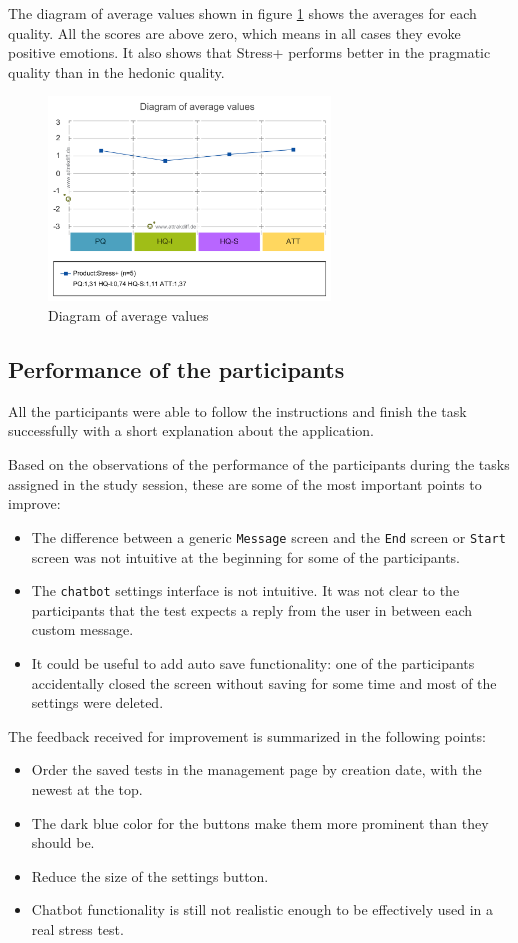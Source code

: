 \documentclass[conference]{IEEEtran}
\begin{document}
The diagram of average values shown in figure \ref{figure-avg-vals} shows the
averages for each quality. All the scores are above zero, which means in all
cases they evoke positive emotions. It also shows that Stress+ performs better
in the pragmatic quality than in the hedonic quality.

\begin{figure}[t!]
\centering
\includegraphics[width=7.5cm]{AttrakDiff/Diagram of average values.png}
\caption{\label{figure-avg-vals}Diagram of average values}
\end{figure}

\subsection{Performance of the participants}
\label{sec:orgbe6298c}
All the participants were able to follow the instructions and finish the task
successfully with a short explanation about the application.

Based on the observations of the performance of the participants during the
tasks assigned in the study session, these are some of the most important points
to improve:
\begin{itemize}
\item The difference between a generic \texttt{Message} screen and the \texttt{End} screen or
\texttt{Start} screen was not intuitive at the beginning for some of the
participants.
\item The \texttt{chatbot} settings interface is not intuitive. It was not clear to the
participants that the test expects a reply from the user in between each
custom message.
\item It could be useful to add auto save functionality: one of the participants
accidentally closed the screen without saving for some time and most of the
settings were deleted.
\end{itemize}

The feedback received for improvement is summarized in the following points:
\begin{itemize}
\item Order the saved tests in the management page by creation date, with the newest
at the top.
\item The dark blue color for the buttons make them more prominent than they should
be.
\item Reduce the size of the settings button.
\item Chatbot functionality is still not realistic enough to be effectively used in
a real stress test.
\end{itemize}
\end{document}
